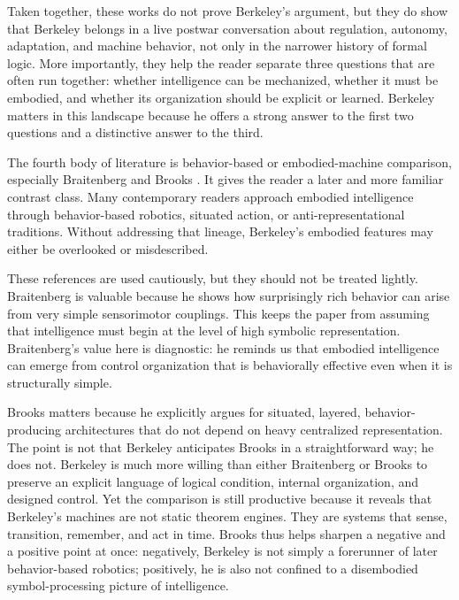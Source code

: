 \documentclass[11pt]{article}
\begin{document}
Taken together, these works do not prove Berkeley's argument, but they do show that Berkeley belongs in a live postwar conversation about regulation, autonomy, adaptation, and machine behavior, not only in the narrower history of formal logic. More importantly, they help the reader separate three questions that are often run together: whether intelligence can be mechanized, whether it must be embodied, and whether its organization should be explicit or learned. Berkeley matters in this landscape because he offers a strong answer to the first two questions and a distinctive answer to the third.

The fourth body of literature is behavior-based or embodied-machine comparison, especially Braitenberg and Brooks \citep{braitenberg1984vehicles,brooks1986robust,brooks1991intelligence}. It gives the reader a later and more familiar contrast class. Many contemporary readers approach embodied intelligence through behavior-based robotics, situated action, or anti-representational traditions. Without addressing that lineage, Berkeley's embodied features may either be overlooked or misdescribed.

These references are used cautiously, but they should not be treated lightly. Braitenberg is valuable because he shows how surprisingly rich behavior can arise from very simple sensorimotor couplings. This keeps the paper from assuming that intelligence must begin at the level of high symbolic representation. Braitenberg's value here is diagnostic: he reminds us that embodied intelligence can emerge from control organization that is behaviorally effective even when it is structurally simple.

Brooks matters because he explicitly argues for situated, layered, behavior-producing architectures that do not depend on heavy centralized representation. The point is not that Berkeley anticipates Brooks in a straightforward way; he does not. Berkeley is much more willing than either Braitenberg or Brooks to preserve an explicit language of logical condition, internal organization, and designed control. Yet the comparison is still productive because it reveals that Berkeley's machines are not static theorem engines. They are systems that sense, transition, remember, and act in time. Brooks thus helps sharpen a negative and a positive point at once: negatively, Berkeley is not simply a forerunner of later behavior-based robotics; positively, he is also not confined to a disembodied symbol-processing picture of intelligence.
\end{document}
